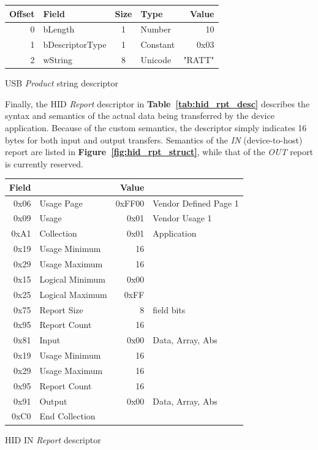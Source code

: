 \documentclass[a4paper,10pt]{article}
\makeatletter
\newenvironment{tablehere}{\def\@captype{table}\vspace{2ex}}{\vspace{2ex}}
\newcommand{\citef}[1]{\textbf{Figure~\ref{#1}}}
\newcommand{\citet}[1]{\textbf{Table~\ref{#1}}}
\makeatother
\begin{document}
\begin{multicols}{2}
\begin{tablehere}
\centering \footnotesize
\begin{tabular}{|r|l|c|l|r|}
\hline
\textbf{Offset} & \textbf{Field} & \textbf{Size} & \textbf{Type} & \textbf{Value}	\\
\hline
0	& bLength				& 1	& Number	& 10			\\
1	& bDescriptorType		& 1	& Constant	& 0x03			\\
2	& wString				& 8	& Unicode	& "RATT"		\\
\hline
\end{tabular}
\caption{USB \emph{Product} string descriptor}
\label{tab:usb_prod_desc}
\end{tablehere}

Finally, the HID \emph{Report} descriptor in \citet{tab:hid_rpt_desc}
describes the syntax and semantics of the actual data being transferred by the
device application. Because of the custom semantics, the descriptor simply
indicates 16 bytes for both input and output transfers. Semantics of the
\emph{IN} (device-to-host) report are listed in \citef{fig:hid_rpt_struct},
while that of the \emph{OUT} report is currently reserved.

\begin{tablehere}
\centering \footnotesize
\begin{tabular}{|rl|rl|}
\hline
\textbf{Field} & & \textbf{Value} &		\\
\hline
0x06	& Usage Page		& 0xFF00	& Vendor Defined Page 1		\\
0x09	& Usage				& 0x01		& Vendor Usage 1			\\
0xA1	& Collection		& 0x01		& Application				\\
\hline
0x19	& Usage Minimum		& 16		& 							\\
0x29	& Usage Maximum		& 16		&							\\
0x15	& Logical Minimum	& 0x00		&							\\
0x25	& Logical Maximum	& 0xFF		&							\\
0x75	& Report Size		& 8			& field bits				\\
0x95	& Report Count		& 16		& 							\\
0x81	& Input				& 0x00		& Data, Array, Abs			\\
0x19	& Usage Minimum		& 16		& 							\\
0x29	& Usage Maximum		& 16		&							\\
0x95	& Report Count		& 16		& 							\\
0x91	& Output			& 0x00		& Data, Array, Abs			\\
\hline
0xC0	& End Collection	&			&							\\
\hline
\end{tabular}
\caption{HID IN \emph{Report} descriptor}
\label{tab:hid_rpt_desc}
\end{tablehere}


\end{multicols}
\end{document}
